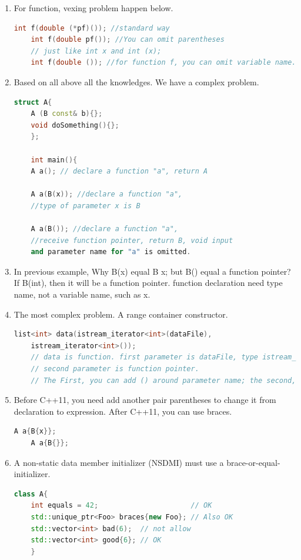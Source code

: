 \documentclass[a4paper,12pt,twoside]{book}
\begin{document}
\begin{enumerate}
	\item For function, vexing problem happen below.
	\begin{lstlisting}[frame=single, language=c++, mathescape=true]
	int f(double (*pf)()); //standard way
	int f(double pf()); //You can omit parentheses
	// just like int x and int (x);
	int f(double ()); //for function f, you can omit variable name.                 
	\end{lstlisting}
	
	\item Based on all above all the knowledges. We have a complex problem.
	\begin{lstlisting}[frame=single, language=c++, mathescape=true]
	struct A{
	A (B const& b){};
	void doSomething(){};
	};
	
	int main(){    
	A a(); // declare a function "a", return A
	
	A a(B(x)); //declare a function "a",   
	//type of parameter x is B
	
	A a(B()); //declare a function "a",
	//receive function pointer, return B, void input
	and parameter name for "a" is omitted.   
	\end{lstlisting}
	
	\item In previous example, Why B(x) equal B x; but B() equal a function pointer? If B(int), then it will be a function pointer.  function declaration need type name, not a variable name, such as x.
	
	\item The most complex problem. A range container constructor. 
	\begin{lstlisting}[frame=single, language=c++, mathescape=true]
	list<int> data(istream_iterator<int>(dataFile), 
	istream_iterator<int>()); 
	// data is function. first parameter is dataFile, type istream_iterator<int>
	// second parameter is function pointer. 
	// The First, you can add () around parameter name; the second, you can omit parameter name
	\end{lstlisting}
	
	\item Before C++11, you need add another pair parentheses to change it from declaration to expression. After C++11, you can use braces.
	\begin{lstlisting}[frame=single, language=c++, mathescape=true]
	A a{B{x}}; 
	A a{B{}};
	\end{lstlisting} 
	
	\item A non-static data member initializer (NSDMI) must use a brace-or-equal-initializer.
	\begin{lstlisting}[frame=single, language=c++, mathescape=true]
	class A{
	int equals = 42;                      // OK
	std::unique_ptr<Foo> braces{new Foo}; // Also OK
	std::vector<int> bad(6);  // not allow
	std::vector<int> good{6}; // OK  
	}  
	\end{lstlisting}
	

\end{enumerate}
\end{document}
